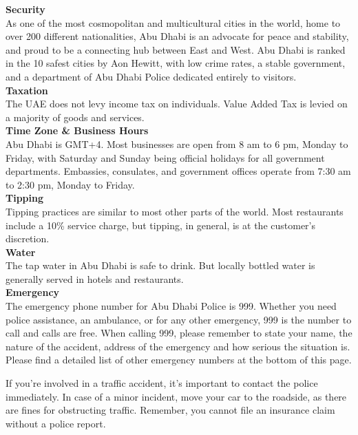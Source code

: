 {\large \textbf{Security}}\\
As one of the most cosmopolitan and multicultural cities in the world, home to over 200 different nationalities, 
 Abu Dhabi is an advocate for peace and stability, and proud to be a connecting hub between East and West.
Abu Dhabi is ranked in the 10 safest cities by Aon Hewitt, with low crime rates, a stable government,
 and a department of Abu Dhabi Police dedicated entirely to visitors.\\

{\large \textbf{Taxation}}\\
The UAE does not levy income tax on individuals. Value Added Tax is levied on a majority of goods and services.\\

{\large \textbf{Time Zone \& Business Hours}}\\
Abu Dhabi is GMT+4. Most businesses are open from 8 am to 6 pm, Monday to Friday,
 with Saturday and Sunday being official holidays for all government departments. 
Embassies, consulates, and government offices operate from 7:30 am to 2:30 pm, Monday to Friday.\\

{\large \textbf{Tipping}}\\
Tipping practices are similar to most other parts of the world. 
Most restaurants include a 10\% service charge, but tipping, in general, is at the customer’s discretion.\\

{\large \textbf{Water}}\\
The tap water in Abu Dhabi is safe to drink. But locally bottled water is generally served in hotels and restaurants.\\

{\large \textbf{Emergency}\\}
The emergency phone number for Abu Dhabi Police is 999. 
Whether you need police assistance, an ambulance, or for any other emergency, 999 is the number to call and calls are free. 
When calling 999, please remember to state your name, the nature of the accident, address of the emergency and how serious the situation is. 
Please find a detailed list of other emergency numbers at the bottom of this page.

If you’re involved in a traffic accident, it’s important to contact the police immediately. 
In case of a minor incident, move your car to the roadside, as there are fines for obstructing traffic. 
Remember, you cannot file an insurance claim without a police report.

